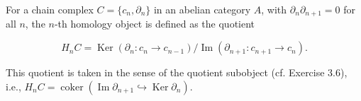 For a chain complex $C = \{c_n, \partial_n\}$ in an abelian category $A$, with $\partial_n \partial_{n+1} = 0$ for all $n$, the $n$-th homology object is defined as the quotient

$$H_n C = \operatorname{Ker} \left( \partial_n : c_n \rightarrow c_{n-1} \right) / \operatorname{Im} \left( \partial_{n+1} : c_{n+1} \rightarrow c_n \right).$$

This quotient is taken in the sense of the quotient subobject (cf. Exercise 3.6), i.e., $H_n C = \operatorname{coker}(\operatorname{Im} \partial_{n+1} \hookrightarrow \operatorname{Ker} \partial_n)$.
